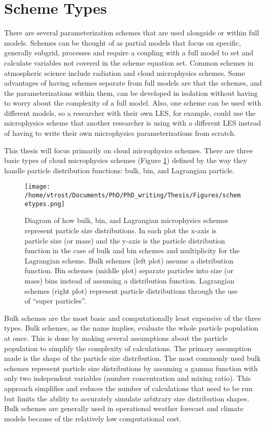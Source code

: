 \section{Scheme Types} \label{sec:schemeTypes}
There are several parameterization schemes that are used alongside or within full models. Schemes can be thought of as partial models that focus on specific, generally subgrid, processes and require a coupling with a full model to set and calculate variables not covered in the scheme equation set. Common schemes in atmospheric science include radiation and cloud microphysics schemes. Some advantages of having schemes separate from full models are that the schemes, and the parameterizations within them, can be developed in isolation without having to worry about the complexity of a full model. Also, one scheme can be used with different models, so a researcher with their own LES, for example, could use the microphysics scheme that another researcher is using with a different LES instead of having to write their own microphysics parameterizations from scratch. 

This thesis will focus primarily on cloud microphysics schemes. There are three basic types of cloud microphysics schemes (Figure \ref{fig:schemeTypes}) defined by the way they handle particle distribution functions: bulk, bin, and Lagrangian particle.

\begin{figure}[H]
	\centering
	\texttt{[image: /home/vtrost/Documents/PhD/PhD\_writing/Thesis/Figures/schemetypes.png]}
	\caption{Diagram of how bulk, bin, and Lagrangian microphysics schemes represent particle size distributions. In each plot the x-axis is particle size (or mass) and the y-axis is the particle distribution function in the case of bulk and bin schemes and multiplicity for the Lagrangian scheme. Bulk schemes (left plot) assume a distribution function. Bin schemes (middle plot) separate particles into size (or mass) bins instead of assuming a distribution function. Lagrangian schemes (right plot) represent particle distributions through the use of “super particles”. \citep[][Figure 3]{morr2020}}
	\label{fig:schemeTypes}
\end{figure}

Bulk schemes are the most basic and computationally least expensive of the three types. Bulk schemes, as the name implies, evaluate the whole particle population at once. This is done by making several assumptions about the particle population to simplify the complexity of calculations. The primary assumption made is the shape of the particle size distribution. The most commonly used bulk schemes represent particle size distributions by assuming a gamma function with only two independent variables (number concentration and mixing ratio). This approach simplifies and reduces the number of calculations that need to be run but limits the ability to accurately simulate arbitrary size distribution shapes. Bulk schemes are generally used in operational weather forecast and climate models because of the relatively low computational cost. \citep{lee2018, morr2020}


